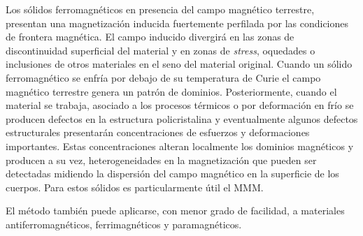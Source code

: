 Los sólidos ferromagnéticos en presencia del campo magnético terrestre, presentan una magnetización inducida fuertemente perfilada por las condiciones de frontera magnética. El campo inducido divergirá en las zonas de discontinuidad superficial del material y en zonas de \textit{stress}, oquedades o inclusiones de otros materiales en el seno del material original. 
Cuando un sólido ferromagnético se enfría por debajo de su temperatura de Curie el campo magnético terrestre genera un patrón de dominios. Posteriormente, cuando el material se trabaja, asociado a los procesos térmicos o por deformación en frío se producen defectos en la estructura policristalina y eventualmente algunos defectos estructurales presentarán concentraciones de esfuerzos y deformaciones importantes. Estas concentraciones alteran localmente los dominios magnéticos y producen a su vez, heterogeneidades en la magnetización que pueden ser detectadas midiendo la dispersión del campo magnético en la superficie de los cuerpos. 
Para estos sólidos es particularmente útil el MMM. 

El método también puede aplicarse, con menor grado de facilidad, a materiales  antiferromagnéticos, ferrimagnéticos y paramagnéticos.




